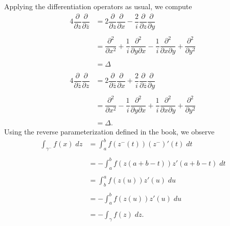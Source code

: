 \documentclass[12pt]{article}
\newenvironment{statement}[1]{\smallskip\noindent\color{black}{\bf #1.}}{}
\theoremstyle{definition}
\theoremstyle{remark}
\newcommand{\p}{\partial}
\begin{document}
\\\\
\begin{statement}{1.10}
Applying the differentiation operators as usual, we compute
\begin{align*}
4\dfrac{\p}{\p z}\dfrac{\p}{\p\overline{z}} &= 2\dfrac{\p}{\p z}\dfrac{\p}{\p x} - \dfrac{2}{i}\dfrac{\p}{\p z}\dfrac{\p}{\p y} \\\\
&= \dfrac{\p^{2}}{\p x^{2}} + \dfrac{1}{i}\dfrac{\p^{2}}{\p y\p x} - \dfrac{1}{i}\dfrac{\p^{2}}{\p x\p y} + \dfrac{\p^{2}}{\p y^{2}} \\\\
&= \Delta \\\\
4\dfrac{\p}{\p \overline{z}}\dfrac{\p}{\p z} &= 2\dfrac{\p}{\p \overline{z}}\dfrac{\p}{\p x} + \dfrac{2}{i}\dfrac{\p}{\p \overline{z}}\dfrac{\p}{\p y} \\\\
&= \dfrac{\p^{2}}{\p x^{2}} - \dfrac{1}{i}\dfrac{\p^{2}}{\p y\p x} + \dfrac{1}{i}\dfrac{\p^{2}}{\p x\p y} + \dfrac{\p^{2}}{\p y^{2}} \\\\
&= \Delta.
\end{align*}
\end{statement}
\begin{statement}{1.24}
Using the reverse parameterization defined in the book, we observe
\begin{align*}
\int_{\gamma^{-}}f(x)\;dz &= \int_{a}^{b}f(z^{-}(t))(z^{-})'(t)\;dt \\\\
&= -\int_{a}^{b}f(z(a + b - t))z'(a + b - t)\;dt \\\\
&= \int_{b}^{a}f(z(u))z'(u)\;du \\\\
&= -\int_{a}^{b}f(z(u))z'(u)\;du \\\\
&= -\int_{\gamma}f(z)\;dz.
\end{align*}
\end{statement}
\end{document}
